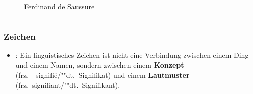\begin{frame}
\begin{columns}
\begin{column}{.5\textwidth}
\begin{figure}
	\caption{Ferdinand de Saussure}	
\end{figure}
	
\end{column}

\end{columns}

\end{frame}


\begin{frame} \frametitle{Zeichen}

\begin{itemize}
	\item \citet{Saussure16x}: Ein linguistisches Zeichen ist nicht eine Verbindung zwischen einem Ding und einem Namen, sondern zwischen einem \textbf{Konzept} (frz.~\ signifié/""dt.\ Signifikat) und einem \textbf{Lautmuster} (frz.\ signifiant/""dt.\ Signifikant).
\end{itemize}	



\end{frame}
